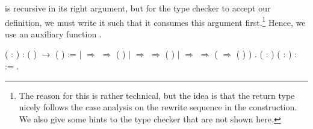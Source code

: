  is recursive in its
right argument, but for the \Coq type checker to accept our
definition, we must write it such that it consumes this argument
first.\footnote{The reason for this is rather technical, but the idea
  is that the return type nicely follows the case analysis on the
  rewrite sequence in the  construction. We also give
  some hints to the \Coq type checker that are not shown here.}
Hence, we use an auxiliary function
.
\begin{singlespace}
\begin{coqdoccode}
\coqdocnoindent
{}
   (\coqdocvar{$\varphi$} :
) : (
) \ensuremath{\rightarrow} (
) :=\coqdoceol
\coqdocindent{1.00em}
 \coqdocvariable{$\varphi$} \coqdoceol
\coqdocindent{1.00em}
\ensuremath{|} 
\coqdocvar{\_}          \ensuremath{\Rightarrow} 
\coqdocvar{$\pi$} \ensuremath{\Rightarrow}
( )
\coqdocvariable{$\pi$}\coqdoceol
\coqdocindent{1.00em}
\ensuremath{|} 
\coqdocvar{\_} \coqdocvar{\_} \coqdocvar{$\psi$} \coqdocvar{\_}
 \ensuremath{\Rightarrow}  \coqdocvar{$\pi$}
\ensuremath{\Rightarrow}
(
\coqdocvariable{$\psi$} \coqdocvariable{$\pi$}) \coqdoceol
\coqdocindent{1.00em}
\ensuremath{|} 
\coqdocvar{\_} \coqdocvar{\_}  
  \ensuremath{\Rightarrow}  \coqdocvar{$\pi$}
\ensuremath{\Rightarrow}
 (
 \ensuremath{\Rightarrow}
( ) \coqdocvariable{$\pi$})
\coqdoceol
\coqdocindent{1.00em}
.\coqdoceol
\coqdocemptyline
\coqdocnoindent
{}
 
  (\coqdocvar{$\pi$}
:  
) (\coqdocvar{$\varphi$} : 
 ) :
 :=
\coqdocvariable{$\varphi$} \coqdocvariable{$\pi$}.\coqdoceol
\end{coqdoccode}
\end{singlespace}
